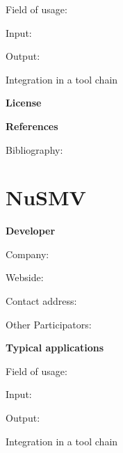 \documentclass{./template/openetcs2}
\begin{document}
	Field of usage:


	Input:

	Output:





	Integration in a tool chain



	\textbf{License}


	\textbf{References}

	Bibliography:


\section{NuSMV}

	\textbf{Developer}

	Company: 

	Webside:

	Contact address:

	Other  Participators:



	\textbf{Typical applications}

	Field of usage:


	Input:

	Output:





	Integration in a tool chain
\end{document}
